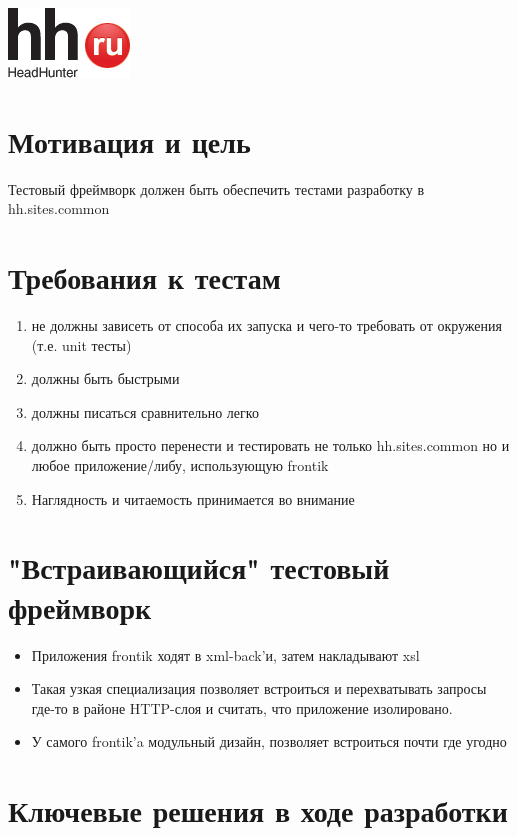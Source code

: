 \documentclass[12pt]{article}
\begin{document}
\TitleSlide
\includegraphics{logo.png}

\section{Мотивация и цель}
Тестовый фреймворк должен быть обеспечить тестами разработку в hh.sites.common

\section{Требования к тестам}

\begin{enumerate}
\item не должны зависеть от способа их запуска и чего-то требовать от окружения (т.е. unit тесты)
\item должны быть быстрыми
\item должны писаться сравнительно легко
\item должно быть просто перенести и тестировать не только hh.sites.common но и любое приложение/либу, использующую frontik
\item Наглядность и читаемость принимается во внимание 
\end{enumerate}

\section{"Встраивающийся" тестовый фреймворк}

\begin{itemize}
\item Приложения frontik ходят в xml-back'и, затем накладывают xsl
\item Такая узкая специализация позволяет встроиться и перехватывать запросы где-то в районе HTTP-слоя и считать, что приложение изолировано.
\item У самого frontik'a модульный дизайн, позволяет встроиться почти где угодно

\end{itemize}

\section{Ключевые решения в ходе разработки}
\end{document}
